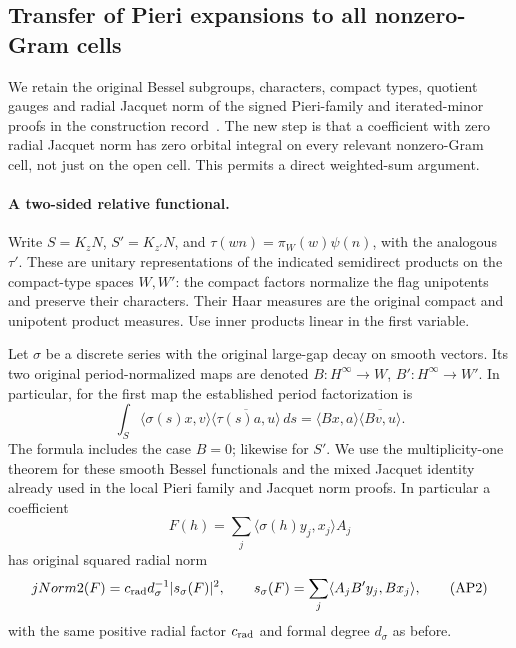 \subsection{Transfer of Pieri expansions to all nonzero-Gram cells}
\label{sec:all-cell-pieri-transfer}

We retain the original Bessel subgroups, characters, compact
types, quotient gauges and radial Jacquet norm of the signed
Pieri-family and iterated-minor proofs in the construction
record~\cite{current-construction-record}.
The new step is that a
coefficient with zero radial Jacquet norm has zero orbital
integral on every relevant nonzero-Gram cell, not just on
the open cell. This permits a direct weighted-sum argument.

\paragraph{A two-sided relative functional.}
Write \(S=K_zN\), \(S'=K_{z'}N\), and
\(\tau(wn)=\pi_W(w)\psi(n)\), with the analogous \(\tau'\).
These are unitary representations of the indicated
semidirect products on the compact-type spaces \(W,W'\):
the compact factors normalize the flag unipotents and
preserve their characters. Their Haar measures are the
original compact and unipotent product measures. Use
inner products linear in the first variable.

Let \(\sigma\) be a discrete series with the original
large-gap decay on smooth vectors. Its two original
period-normalized maps are denoted \(B:H^\infty\to W\),
\(B':H^\infty\to W'\). In particular, for the first map
the established period factorization is
\[
 \int_S\langle\sigma(s)x,v\rangle
                \overline{\langle\tau(s)a,u\rangle}\,ds
       =\langle Bx,a\rangle\overline{\langle Bv,u\rangle}.
                                                        \tag{AP1}
\]
The formula includes the case \(B=0\); likewise for
\(S'\). We use the multiplicity-one theorem for these
smooth Bessel functionals and the mixed Jacquet identity
already used in the local Pieri family and Jacquet norm
proofs. In particular a coefficient
\[
 F(h)=\sum_j\langle\sigma(h)y_j,x_j\rangle A_j
\]
has original squared radial norm
\[
 jNorm2(F)=c_{\rm rad}d_\sigma^{-1}|s_\sigma(F)|^2,\qquad
 s_\sigma(F)=\sum_j\langle A_jB'y_j,Bx_j\rangle,          \tag{AP2}
\]
with the same positive radial factor \(c_{\rm rad}\)
and formal degree \(d_\sigma\) as before.

